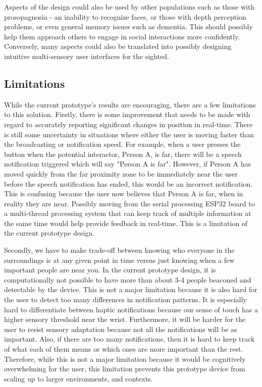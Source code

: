 Aspects of the design could also be used by other populations such as those with prosopagnosia - an inability to recognize faces, or those with depth perception problems, or even general memory issues such as dementia. This should possibly help them approach others to engage in social interactions more confidently. Conversely, many aspects could also be translated into possibly designing intuitive multi-sensory user interfaces for the sighted.

\subsection {Limitations}
While the current prototype's results are encouraging, there are a few limitations to this solution. Firstly, there is some improvement that needs to be made with regard to accurately reporting significant changes in position in real-time. There is still some uncertainty in situations where either the user is moving faster than the broadcasting or notification speed. For example, when a user presses the button when the potential interactor, Person A, is far, there will be a speech notification triggered which will say "Person A is far". However, if Person A has moved quickly from the far proximity zone to be immediately near the user before the speech notification has ended, this would be an incorrect notification. This is confusing because the user now believes that Person A is far, when in reality they are near. Possibly moving from the serial processing ESP32 board to a multi-thread processing system that can keep track of multiple information at the same time would help provide feedback in real-time. This is a limitation of the current prototype design.  

Secondly, we have to make trade-off between knowing who everyone in the surroundings is at any given point in time versus just knowing when a few important people are near you. In the current prototype design, it is computationally not possible to have more than about 3-4 people beaconed and detectable by the device. This is not a major limitation because it is also hard for the user to detect too many differences in notification patterns. It is especially hard to differentiate between haptic notifications because our sense of touch has a higher sensory threshold near the wrist. Furthermore, it will be harder for the user to resist sensory adaptation because not all the notifications will be as important. Also, if there are too many notifications, then it is hard to keep track of what each of them means or which ones are more important than the rest. Therefore, while this is not a major limitation because it would be cognitively overwhelming for the user, this limitation prevents this prototype device from scaling up to larger environments, and contexts.

